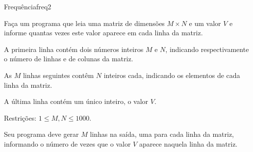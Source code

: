 \documentclass[12pt,a4paper,oneside]{article}
\begin{document}
\begin{problem}{Frequência}{freq}{2}
 
Faça um programa que leia uma matriz de dimensões $M \times N$ e um valor $V$ e informe quantas vezes este valor aparece em cada linha da matriz.

%

\InputFile

A primeira linha contém dois
números inteiros $M$ e $N$, indicando respectivamente o número de linhas e de colunas da matriz.

As $M$ linhas seguintes contêm $N$ inteiros cada, indicando os
elementos de cada linha da matriz.

A última linha contém um único inteiro, o valor $V$.

Restrições: $1 \leq M,N \leq 1000$.

\OutputFile

Seu programa deve gerar $M$ linhas na saída, uma para cada linha da matriz, informando o número de vezes que o valor $V$ aparece naquela linha da matriz.



\Example

\begin{example}
%
\end{example}


\end{problem}
\end{document}
